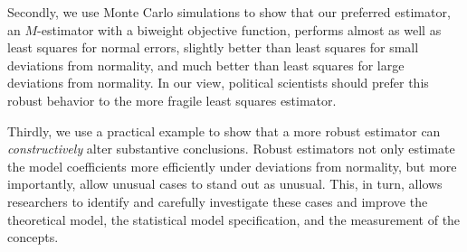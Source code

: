 \documentclass[12pt]{article}
\begin{document}
Secondly, we use Monte Carlo simulations to show that our preferred estimator, an $M$-estimator with a biweight objective function, performs almost as well as least squares for normal errors, slightly better than least squares for small deviations from normality, and much better than least squares for large deviations from normality. 
In our view, political scientists should prefer this robust behavior to the more fragile least squares estimator.

Thirdly, we use a practical example to show that a more robust estimator can \textit{constructively} alter substantive conclusions. 
Robust estimators not only estimate the model coefficients more efficiently under deviations from normality, but more importantly, allow unusual cases to stand out as unusual. 
This, in turn, allows researchers to identify and carefully investigate these cases and improve the theoretical model, the statistical model specification, and the measurement of the concepts.

\singlespace


\end{document}
